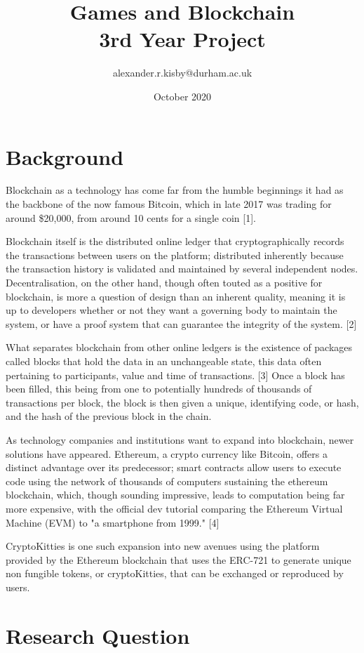 \documentclass{article}
\title{Games and Blockchain \\3rd Year Project}
\author{alexander.r.kisby@durham.ac.uk }
\date{October 2020}
\begin{document}
\maketitle

\section{Background}
Blockchain as a technology has come far from the humble beginnings it had as the backbone of the now famous Bitcoin, which in late 2017 was trading for around \$20,000, from around 10 cents for a single coin [1].

Blockchain itself is the distributed online ledger that cryptographically records the transactions between users on the platform; distributed inherently because the transaction history is validated and maintained by several independent nodes. Decentralisation, on the other hand, though often touted as a positive for blockchain, is more a question of design than an inherent quality, meaning it is up to developers whether or not they want a governing body to maintain the system, or have a proof system that can guarantee the integrity of the system. [2] 

What separates blockchain from other online ledgers is the existence of packages called blocks that hold the data in an unchangeable state, this data often pertaining to participants, value and time of transactions.  [3] Once a block has been filled, this being from one to potentially hundreds of thousands of transactions per block, the block is then given a unique, identifying code, or hash, and the hash of the previous block in the chain. 

As technology companies and institutions want to expand into blockchain, newer solutions have appeared. Ethereum, a crypto currency like Bitcoin, offers a distinct advantage over its predecessor; smart contracts allow users to execute code using the network of thousands of computers sustaining the ethereum blockchain, which, though sounding impressive, leads to computation being far more expensive, with the official dev tutorial comparing the Ethereum Virtual Machine (EVM) to "a smartphone from 1999." [4] 

CryptoKitties is one such expansion into new avenues using the platform provided by the Ethereum blockchain that uses the ERC-721 to generate unique non fungible tokens, or cryptoKitties, that can be exchanged or reproduced by users. 
\section{Research Question}
\end{document}
